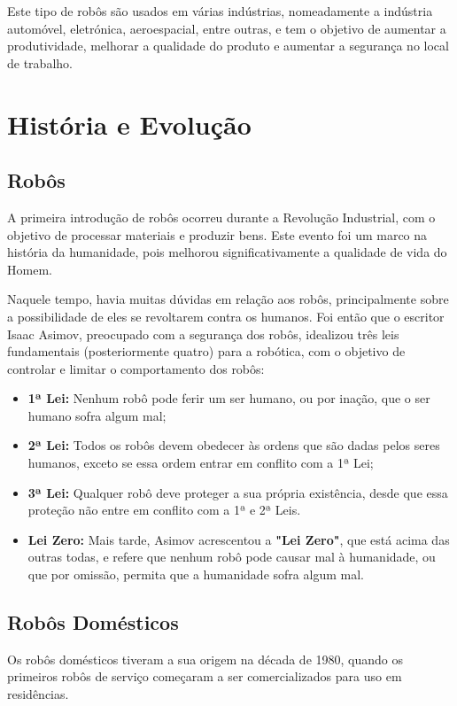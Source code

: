 \documentclass[10pt]{article}
\begin{document}
Este tipo de robôs são usados em várias indústrias, nomeadamente a indústria automóvel, eletrónica, aeroespacial, entre outras, e tem o objetivo de aumentar a produtividade, melhorar a qualidade do produto e aumentar a segurança no local de trabalho.

\section{História e Evolução}

\subsection{Robôs}
\hspace{\parindent}A primeira introdução de robôs ocorreu durante a Revolução Industrial, com o objetivo de processar materiais e produzir bens. Este evento foi um marco na história da humanidade, pois melhorou significativamente a qualidade de vida do Homem.

Naquele tempo, havia muitas dúvidas em relação aos robôs, principalmente sobre a possibilidade de eles se revoltarem contra os humanos. Foi então que o escritor Isaac Asimov, preocupado com a segurança dos robôs, idealizou três leis fundamentais (posteriormente quatro) para a robótica, com o objetivo de controlar e limitar o comportamento dos robôs\cite{wikipedia_2022}:

\begin{itemize}
    \item \textbf{1ª Lei:} Nenhum robô pode ferir um ser humano, ou por inação, que o ser humano sofra algum mal;
    \item \textbf{2ª Lei:} Todos os robôs devem obedecer às ordens que são dadas pelos seres humanos, exceto se essa ordem entrar em conflito com a 1ª Lei;
    \item \textbf{3ª Lei:} Qualquer robô deve proteger a sua própria existência, desde que essa proteção não entre em conflito com a 1ª e 2ª Leis.
    \item \textbf{Lei Zero:} Mais tarde, Asimov acrescentou a \textbf{"Lei Zero"}, que está acima das outras todas, e refere que nenhum robô pode causar mal à humanidade, ou que por omissão, permita que a humanidade sofra algum mal.
\end{itemize}

\subsection{Robôs Domésticos}
\hspace{\parindent}Os robôs domésticos\cite{history} tiveram a sua origem na década de 1980, quando os primeiros robôs de serviço começaram a ser comercializados para uso em residências.
\end{document}
